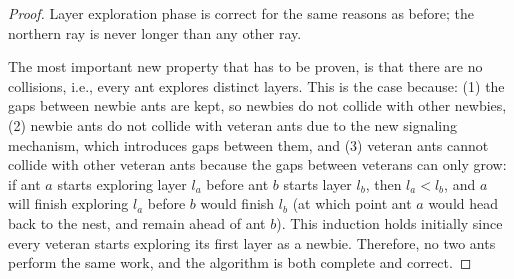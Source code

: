\begin{proof}
Layer exploration phase is correct for the same reasons as before; the northern ray is never
longer than any other ray.

The most important new property that has to be proven, is that there are no collisions, i.e.,
every ant explores distinct layers. This is the case because:
(1) the gaps between newbie ants are kept, so newbies do not collide with other newbies, 
(2) newbie ants do not collide with veteran ants due to the new signaling mechanism, 
which introduces gaps between them, and
(3) veteran ants cannot collide with other veteran ants because the gaps between veterans 
can only grow: if ant $a$ starts exploring layer $l_a$ before ant $b$ starts layer $l_b$, then 
$l_a < l_b$, and $a$ will finish exploring $l_a$ before $b$ would finish $l_b$ (at which
point ant $a$ would head back to the nest, and remain ahead of ant $b$). This induction
 holds initially since every veteran starts exploring its first layer as a newbie.
Therefore, no two ants perform the same work, and the algorithm is both complete 
and correct.
\end{proof}
